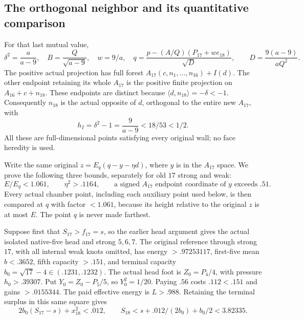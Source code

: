 \documentclass[11pt]{article}
\theoremstyle{definition}
\theoremstyle{remark}
\newcommand{\ip}[2]{\langle #1,#2\rangle}
\begin{document}
\subsection{The orthogonal neighbor and its quantitative comparison}
\label{app:B18A17comparison}
For that last mutual value,
\[
 \delta^2=\frac a{a-9},\quad B=\frac Q{\sqrt{a-9}},\quad w=9/a,\quad
 q=\frac{p-(A/Q)(P_{17}+we_{18})}{\sqrt D},\qquad
 D=\frac{9(a-9)}{aQ^2}.
\]
The positive actual projection has full forest
\(A_{17}(c,n_1,\ldots,n_{16})+I(d)\).
The other endpoint retaining its whole \(A_{17}\) is the positive
finite projection on \(A_{16}+c+n_{18}\). These endpoints are distinct
because \(\ip d{n_{18}}=-\delta<-1\).
Consequently \(n_{18}\) is the actual opposite of \(d\), orthogonal
to the entire new \(A_{17}\), with
\[
 h_I=\delta^2-1=\frac9{a-9}<18/53<1/2.
\]
All these are full-dimensional points satisfying every original wall;
no face heredity is used.

Write the same original \(z=E_q(q-y-\eta d)\), where \(y\)
is in the \(A_{17}\) space. We prove the following three bounds,
separately for old \(17\) strong and weak:
\begin{equation}\label{eq:B18A17interface}
 E/E_q<1.061,\qquad \eta^2>.1164,\qquad
 \text{a signed \(A_{17}\) endpoint coordinate of \(y\) exceeds } .51 .
\end{equation}
Every actual chamber point, including each auxiliary point used below,
is then compared at \(q\) with factor \(<1.061\), because its height
relative to the original \(z\) is at most \(E\).
The point \(q\) is never made farthest.

Suppose first that \(S_{17}>f_{17}=s\), so the earlier head argument
gives the actual isolated native-five head and strong \(5,6,7\).
The original reference through strong \(17\), with all internal
weak knots omitted, has energy \(>.97253117\),
first-five mean \(b<.3652\), fifth capacity \(>.151\), and
terminal capacity \(b_0=\sqrt{17}-4\in(.1231,.1232)\).
The actual head foot is \(Z_0=P_4/4\), with pressure
\(h_0>.39307\). Put \(Y_0=Z_0-P_5/5\), so \(Y_0^2=1/20\).
Paying \(.56\) costs \(.112<.151\) and gains \(>.0155344\).
The paid effective energy is \(L>.988\). Retaining the terminal
surplus in this same square gives
\[
 2b_0(S_{17}-s)+x_{18}^2<.012,\qquad
 S_{18}<s+.012/(2b_0)+b_0/2<3.82335 .
\]
\end{document}
